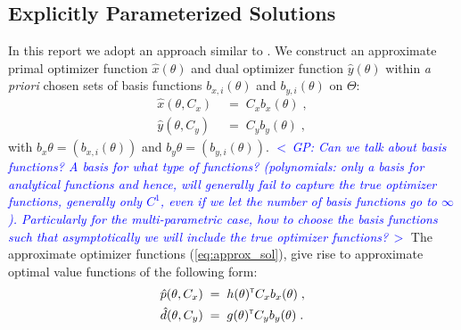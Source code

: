 \documentclass{article}
\renewcommand{\t}{^{\mbox{\tiny \sf T}}}    %
\newcommand{\ppar}{\theta}                  %
\newcommand{\Ppar}{\Theta}                  %
\newcommand{\commentGP}[1]{\noindent \textcolor{blue}{\emph{$<\,$GP: #1$\,>$}}}%
\begin{document}
\subsection{Explicitly Parameterized Solutions}\label{subsec:parameterized_solution}%

In this report we adopt an approach similar to \cite{Oishi2013}. We construct an approximate primal optimizer function $\hat{x}(\ppar)$ and dual optimizer function $\hat{y}(\ppar)$ within \textit{a priori} chosen sets of basis functions $b_{x,i}(\ppar)$ and $b_{y,i}(\ppar)$ on $\Ppar$:
\begin{subequations}\label{eq:approx_sol}
\begin{align}
\hat{x}(\ppar, C_x) &\;=\; C_x b_x(\ppar)\;, \label{eq:approx_sol_primal}\\
\hat{y}(\ppar, C_y) &\;=\; C_y b_y(\ppar)\;, \label{eq:approx_sol_dual}
\end{align}
\end{subequations}
with $b_x{\ppar}=(b_{x,i}(\ppar))$ and $b_y{\ppar}=(b_{y,i}(\ppar))$. \commentGP{Can we talk about basis functions? A basis for what type of functions? (polynomials: only a basis for analytical functions and hence, will generally fail to capture the true optimizer functions, generally only $C^1$, even if we let the number of basis functions go to $\infty$). Particularly for the multi-parametric case, how to choose the basis functions such that asymptotically we will include the true optimizer functions?} The approximate optimizer functions (\ref{eq:approx_sol}), give rise to approximate optimal value functions of the following form:
\begin{align*}
\hat{p}(\ppar, C_x) &\;=\;  h(\ppar)\t  C_x b_x(\ppar)\;,\\
\hat{d}(\ppar, C_y) &\;=\;  g(\ppar)\t  C_y b_y(\ppar)\;.
\end{align*}
\end{document}
